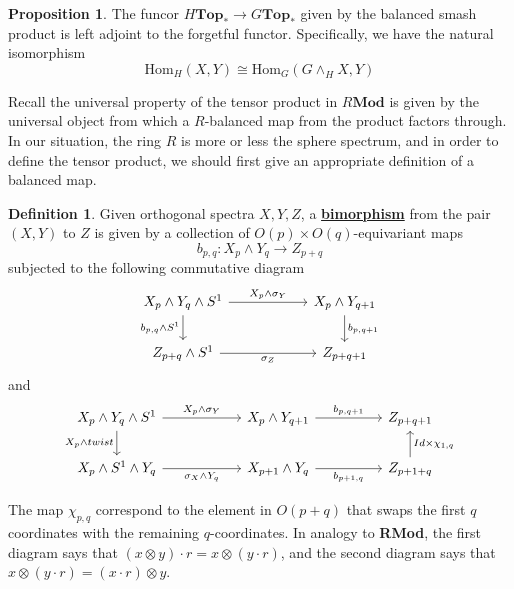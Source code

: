 \documentclass{article}
\theoremstyle{definition}
\newtheorem{definition}[theorem]{Definition}
\newtheorem{proposition}[theorem]{Proposition}
\begin{document}
\begin{tcolorbox}[colback=blue!5!white,colframe=blue!30!white]
\begin{proposition}
The funcor $H\textbf{Top}_*\to G\textbf{Top}_*$ given by the balanced smash product is left adjoint to the forgetful functor. Specifically, we have the natural isomorphism
\[\textrm{Hom}_H(X,Y)\cong \textrm{Hom}_G(G\wedge_H X, Y)\]
\end{proposition}
\end{tcolorbox}
Recall the universal property of the tensor product in $R\textbf{Mod}$ is given by the universal object from which a $R$-balanced map from the product factors through. In our situation, the ring $R$ is more or less the sphere spectrum, and in order to define the tensor product, we should first give an appropriate definition of a balanced map.


\begin{tcolorbox}[colback=purple!5!white,colframe=purple!75!black]
\begin{definition}
    Given orthogonal spectra $X,Y, Z$, a \underline{\textbf{bimorphism}} from the pair $(X,Y)$ to $Z$ is given by a collection of $O(p)\times O(q)$-equivariant maps 
    \[b_{p,q}: X_p\wedge Y_q\to Z_{p+q}\] 
    subjected to the following commutative diagram
    \[\begin{tikzcd}
        {X_p\wedge Y_q\wedge S^1} && {X_{p}\wedge Y_{q+1}} \\
        {Z_{p+q}\wedge S^1} & {} & {Z_{p+q+1}}
        \arrow["{X_p\wedge \sigma_{Y}}", from=1-1, to=1-3]
        \arrow["{b_{p,q}\wedge S^1}"', from=1-1, to=2-1]
        \arrow["{b_{p,q+1}}", from=1-3, to=2-3]
        \arrow["{\sigma_{Z}}"', from=2-1, to=2-3]
    \end{tikzcd}\]
    and 
    \[\begin{tikzcd}
        {X_p\wedge Y_q\wedge S^1} && {X_{p}\wedge Y_{q+1}} && {Z_{p+q+1}} \\
        {X_p\wedge S^1\wedge Y_q} & {} & {X_{p+1}\wedge Y_{q}} && {Z_{p+1+q}}
        \arrow["{X_p\wedge \sigma_{Y}}", from=1-1, to=1-3]
        \arrow["{X_p\wedge twist}"', from=1-1, to=2-1]
        \arrow["{b_{p,q+1}}", from=1-3, to=1-5]
        \arrow["{\sigma_X\wedge Y_q}"', from=2-1, to=2-3]
        \arrow["{b_{p+1,q}}"', from=2-3, to=2-5]
        \arrow["{Id\times \chi_{1,q}}"', from=2-5, to=1-5]
    \end{tikzcd}\]
\end{definition}
\end{tcolorbox}
The map $\chi_{p,q}$ correspond to the element in $O(p+q)$ that swaps the first $q$ coordinates with the remaining $q$-coordinates. In analogy to \textbf{RMod}, the first diagram says that $(x\otimes y)\cdot r=x\otimes (y\cdot r)$, and the second diagram says that $x\otimes (y\cdot r)=(x\cdot r)\otimes y$. 
\end{document}
